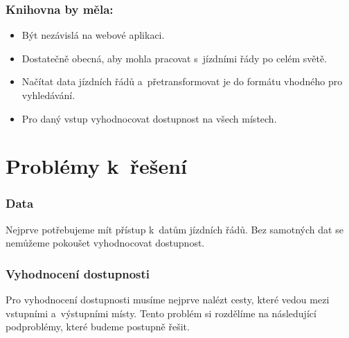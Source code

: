 \subsubsection{Knihovna by měla:} %
\begin{itemize}
    \item Být nezávislá na webové aplikaci.
    
    \item Dostatečně obecná, aby mohla pracovat s~jízdními řády po celém světě.
    
    \item Načítat data jízdních řádů a~přetransformovat je do formátu vhodného pro vyhledávání.
    
    \item Pro daný vstup vyhodnocovat dostupnost na všech místech. %
\end{itemize}


\section{Problémy k~řešení}


\subsubsection{Data}\label{problemyKReseni-data}

Nejprve potřebujeme mít přístup k~datům jízdních řádů. Bez samotných dat se nemůžeme pokoušet vyhodnocovat dostupnost.


\subsubsection{Vyhodnocení dostupnosti}\label{problemyKReseni-dostupnost}

Pro vyhodnocení dostupnosti musíme nejprve nalézt cesty, které vedou mezi vstupními a~výstupními místy. Tento problém si rozdělíme na následující podproblémy, které budeme postupně řešit.

